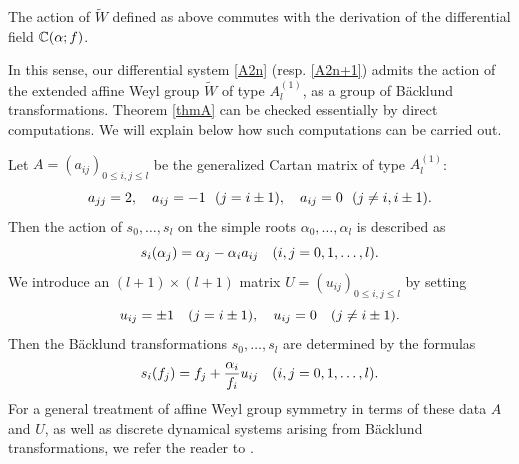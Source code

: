 \begin{thm}
The action of $\widetilde{W}$ defined as 
above commutes with the derivation of the differential field 
${\Bbb C}(\alpha;f)$.
\end{thm}

\noindent
In this sense, our differential system \eqref{A2n} (resp. \eqref{A2n+1}) 
admits the action of the extended affine Weyl group $\widetilde{W}$ of 
type $A^{(1)}_l$, as a group of B\"acklund transformations. 
Theorem \ref{thmA} can be checked essentially by direct computations.  We will explain below 
how such computations can be carried out. 

\begin{rem}
Let $A=(a_{ij})_{0\le i,j\le l}$ be the generalized Cartan matrix of type 
$A^{(1)}_{l}$:
\begin{equation}\Label{GCM}
a_{jj}=2,\quad a_{ij}=-1\ \ (j=i\pm1),\quad a_{ij}=0\ \ (j\ne i,i\pm1). 
\end{equation}
Then the action of $s_0,\ldots,s_l$ on the simple roots $\alpha_0,\ldots,\alpha_l$ 
is described as 
\begin{equation}\Label{s-on-a}
s_i(\alpha_j)=\alpha_j-\alpha_i a_{ij}\quad(i,j=0,1,\ldots,l). 
\end{equation}
We introduce an $(l+1)\times(l+1)$ matrix $U=(u_{ij})_{0\le i,j\le l}$ by setting
\begin{equation}\Label{def-U}
u_{ij}=\pm 1 \quad (j=i\pm 1), \quad u_{ij}=0\quad(j\ne i\pm 1). 
\end{equation}
Then the B\"acklund transformations $s_0,\ldots,s_l$ are determined by the 
formulas
\begin{equation}\Label{s-on-f}
s_{i}(f_j)=f_j+\frac{\alpha_i}{f_i} u_{ij}\quad(i,j=0,1,\ldots,l). 
\end{equation}
For a general treatment of affine Weyl group symmetry in terms of these data 
$A$ and $U$, as well as discrete dynamical systems arising from B\"acklund 
transformations, we refer the reader to \cite{NY3}. 
\end{rem}

